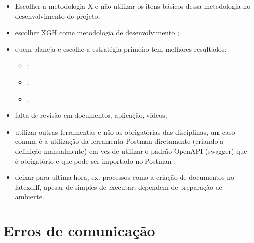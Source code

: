 \begin{itemize}
    \item Escolher a metodologia X e não utilizar os itens básicos dessa metodologia no desenvolvimento do projeto;
    
    \item escolher XGH como metodologia de desenvolvimento \cite{xgh} \cite{xgh-axioms};
    
    \item quem planeja e escolhe a estratégia primeiro tem melhores resultados:
    \begin{itemize}
        \item 
        ;
        \item
        ;
    
        \item %
        .    
    \end{itemize}
    
    \item falta de revisão em documentos, aplicação, vídeos;
    
    \item utilizar outras ferramentas e não as obrigatórias das disciplinas, um caso comum é a utilização da ferramenta Postman diretamente (criando a definição manualmente) em vez de utilizar o padrão OpenAPI (swagger) que é obrigatório e que pode ser importado no Postman \cite{postman-openapi};
    
    \item deixar para ultima hora, ex. processos como a criação de documentos no latexdiff, apesar de simples de executar, dependem de preparação de ambiente.
\end{itemize}



\section{Erros de comunicação}

